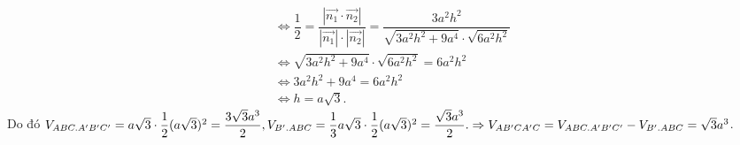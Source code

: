 \begin{ex}
{\begin{align*}
		&\Leftrightarrow \dfrac{1}{2}=\dfrac{\left|\overrightarrow{n_1}\cdot \overrightarrow{n_2}\right|}{\left|\overrightarrow{n_1}\right|\cdot \left|\overrightarrow{n_2}\right|}=\dfrac{3a^2h^2}{\sqrt{3a^2h^2+9a^4}\cdot \sqrt{6a^2h^2}}\\
		&\Leftrightarrow \sqrt{3a^2h^2+9a^4}\cdot \sqrt{6a^2h^2}=6a^2h^2\\ &\Leftrightarrow 3a^2h^2+9a^4=6a^2h^2\\
		&\Leftrightarrow h=a\sqrt{3}.
		\end{align*}
		Do đó $V_{ABC.A'B'C'}=a\sqrt{3}\cdot \dfrac{1}{2}(a\sqrt{3})^2=\dfrac{3\sqrt{3}a^3}{2}, V_{B'.ABC}=\dfrac{1}{3}a\sqrt{3}\cdot \dfrac{1}{2}(a\sqrt{3})^2=\dfrac{\sqrt{3}a^3}{2}. \\
		\Rightarrow V_{AB'CA'C}=V_{ABC.A'B'C'}-V_{B'.ABC}=\sqrt{3}a^3$.
	}
\end{ex}
